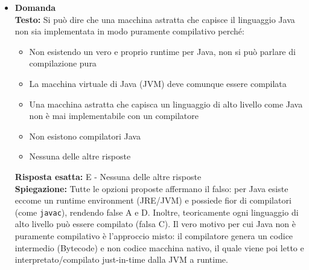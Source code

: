 \documentclass[12pt, a4paper]{article}
\newcounter{domandateoria}
\begin{document}
\begin{itemize}
    \item {}\textbf{Domanda \thedomandateoria} \\
    \textbf{Testo:} Si può dire che una macchina astratta che capisce il linguaggio Java non sia implementata in modo puramente compilativo perché:
    \begin{itemize}
        \item[A)] Non esistendo un vero e proprio runtime per Java, non si può parlare di compilazione pura
        \item[B)] La macchina virtuale di Java (JVM) deve comunque essere compilata
        \item[C)] Una macchina astratta che capisca un linguaggio di alto livello come Java non è mai implementabile con un compilatore
        \item[D)] Non esistono compilatori Java
        \item[E)] Nessuna delle altre risposte
    \end{itemize}
    \textbf{Risposta esatta:} E - Nessuna delle altre risposte \\
    \textbf{Spiegazione:} Tutte le opzioni proposte affermano il falso: per Java esiste eccome un runtime environment (JRE/JVM) e possiede fior di compilatori (come \texttt{javac}), rendendo false A e D. Inoltre, teoricamente ogni linguaggio di alto livello può essere compilato (falsa C). Il vero motivo per cui Java non è puramente compilativo è l'approccio misto: il compilatore genera un codice intermedio (Bytecode) e non codice macchina nativo, il quale viene poi letto e interpretato/compilato just-in-time dalla JVM a runtime.
    \vspace{0.3cm}
\end{itemize}

\newpage
\end{document}
